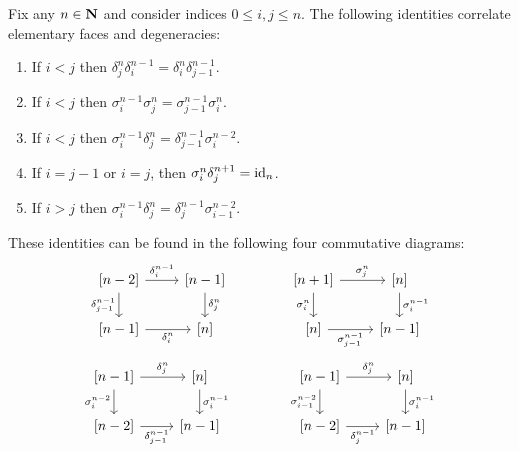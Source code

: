 \begin{corollary}
\label{cor:cosimplicial-identities}
Fix any \(n \in \mathbf{N}\) and consider indices \(0 \leq i, j \leq n\). The following
identities correlate elementary faces and degeneracies:
\begin{enumerate}[(1)]\setlength\itemsep{0em}
\item If \(i < j\) then
  \(\delta_j^n \delta_i^{n-1} = \delta_i^n \delta_{j-1}^{n-1}\).

\item If \(i < j\) then
  \(\sigma_i^{n-1} \sigma_j^n = \sigma_{j-1}^{n-1} \sigma_i^n \).

\item If \(i < j\) then
  \(\sigma_i^{n-1} \delta_j^n = \delta_{j-1}^{n-1} \sigma_i^{n-2}\).

\item If \(i = j - 1\) or \(i = j\), then \(\sigma_i^n \delta_j^{n+1} = \operatorname{id}_n\).

\item If \(i > j\) then
  \(\sigma_i^{n-1} \delta_j^n = \delta_j^{n-1} \sigma_{i-1}^{n-2}\).
\end{enumerate}
These identities can be found in the following four commutative diagrams:
%
\begin{equation*}
  \begin{tikzcd}
  {[n-2]} \ar[r, "\delta_i^{n-1}"] \ar[d, "\delta_{j-1}^{n-1}"']
  &{[n-1]} \ar[d, "\delta_j^n"] \\
  {[n-1]} \ar[r, "\delta_i^n"'] &{[n]}
  \end{tikzcd}
  \qquad
  \qquad
  \begin{tikzcd}
  {[n+1]} \ar[r, "\sigma_j^n"] \ar[d, "\sigma_i^n"']
  &{[n]} \ar[d, "\sigma_i^{n-1}"] \\
  {[n]} \ar[r, "\sigma_{j-1}^{n-1}"'] &{[n-1]}
  \end{tikzcd}
\end{equation*}
%
\begin{equation*}
  \begin{tikzcd}
  {[n - 1]} \ar[r, "\delta_j^n"] \ar[d, "\sigma_i^{n-2}"']
  &{[n]} \ar[d, "\sigma_i^{n-1}"] \\
  {[n-2]} \ar[r, "\delta_{j-1}^{n-1}"'] &{[n-1]}
  \end{tikzcd}
  \qquad
  \qquad
  \begin{tikzcd}
  {[n - 1]} \ar[r, "\delta_j^n"] \ar[d, "\sigma_{i-1}^{n-2}"']
  &{[n]} \ar[d, "\sigma_i^{n-1}"] \\
  {[n-2]} \ar[r, "\delta_j^{n-1}"'] &{[n-1]}
  \end{tikzcd}
\end{equation*}
\end{corollary}

